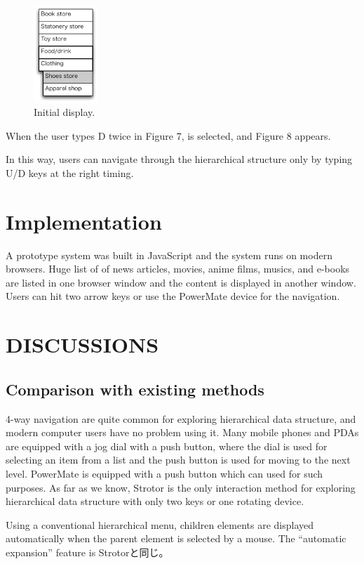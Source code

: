 \documentclass{article}
\begin{document}
\begin{figure}[H]
\centerline{\includegraphics[width=24mm,bb=0 0 139 211]{figures/fig9.pdf}}
\caption{Initial display.}
\label{fig9}
\end{figure}

When the user types D twice in Figure 7,
 is selected, and Figure 8 appears.

In this way, users can navigate through the hierarchical structure
only by typing U/D keys at the right timing.

\section*{Implementation}

A prototype system was built in JavaScript and the system runs on modern browsers.
Huge list of of news articles, movies, anime films, musics, and e-books are listed in one browser window
and the content is displayed in another window.
Users can hit two arrow keys or use the PowerMate device for the navigation.

\section*{DISCUSSIONS}

\subsection{Comparison with existing methods}

4-way navigation are quite common for exploring hierarchical data structure,
and modern computer users have no problem using it.
Many mobile phones and PDAs are equipped with a jog dial with a push button,
where the dial is used for selecting an item from a list and 
the push button is used for moving to the next level.
PowerMate is equipped with a push button which can used for such purposes.
As far as we know,
Strotor is the only interaction method for exploring hierarchical data structure
with only two keys or one rotating device.

Using a conventional hierarchical menu, children elements are displayed automatically
when the parent element is selected by a mouse.
The ``automatic expansion'' feature is Strotorと同じ。
\end{document}
